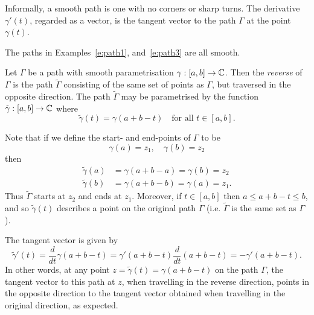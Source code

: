 Informally, a smooth path is one with no corners or sharp turns.  The derivative $\gamma'(t)$, regarded as a vector, is the tangent vector to the path $\Gamma$ at the point $\gamma (t)$.

The paths in Examples~\ref{e:path1}, and~\ref{e:path3} are all smooth.

\begin{definition}
Let $\Gamma$ be a path with smooth parametrisation $\gamma: [a,b] \to \mathbb{C}$.  Then the \emph{reverse} of $\Gamma$ is the path $\tilde{\Gamma}$ consisting of the same set of points as $\Gamma$, but traversed in the opposite direction.  The path $\tilde{\Gamma}$ may be parametrised by the function $\tilde{\gamma} : [a,b] \to \mathbb{C}$ where
\[
\tilde{\gamma} (t) = \gamma (a+b-t) \quad \text{for all } t \in [a,b].
\]
\end{definition}


\begin{blankbox}
Note that if we define the start- and end-points of $\Gamma$ to be
 \[ \gamma (a) = z_1, \quad \gamma (b) = z_2 \] 
 then
\begin{align*}
\tilde{\gamma} (a) & = \gamma (a+b-a) = \gamma (b) = z_2 \\
\tilde{\gamma} (b) & = \gamma (a+b-b) = \gamma (a) = z_1.
\end{align*} 
Thus $\tilde{\Gamma}$ starts at $z_2$ and ends at $z_1$.  Moreover, if $t \in [a,b]$ then $a \leq a+b-t \leq b$, and so $\tilde{\gamma} (t)$ describes a point on the original path $\Gamma$ (i.e. $\tilde{\Gamma}$ is the same set as $\Gamma$).

The tangent vector is given by
\[
\tilde{\gamma} ' (t) = \frac{d}{dt} \gamma (a+b-t) = \gamma'(a+b-t) \frac{d}{dt}(a+b-t) = - \gamma'(a+b-t).
\]
In other words, at any point $z = \tilde{\gamma} (t) = \gamma (a+b-t)$ on the path $\Gamma$, the tangent vector to this path at $z$, when travelling in the reverse direction, points in the opposite direction to the tangent vector obtained when travelling in the original direction, as expected.
\end{blankbox}

